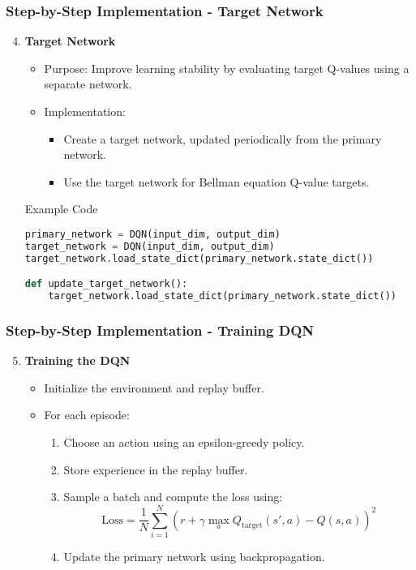 \documentclass[aspectratio=169]{beamer}
\begin{document}
\begin{frame}[fragile]
    \frametitle{Step-by-Step Implementation - Target Network}
    \begin{enumerate}
        \setcounter{enumi}{3}
        \item \textbf{Target Network}
        \begin{itemize}
            \item Purpose: Improve learning stability by evaluating target Q-values using a separate network.
            \item Implementation:
            \begin{itemize}
                \item Create a target network, updated periodically from the primary network.
                \item Use the target network for Bellman equation Q-value targets.
            \end{itemize}
        \end{itemize}
        \begin{block}{Example Code}
        \begin{lstlisting}[language=Python]
primary_network = DQN(input_dim, output_dim)
target_network = DQN(input_dim, output_dim)
target_network.load_state_dict(primary_network.state_dict())

def update_target_network():
    target_network.load_state_dict(primary_network.state_dict())
        \end{lstlisting}
        \end{block}
    \end{enumerate}
\end{frame}

\begin{frame}[fragile]
    \frametitle{Step-by-Step Implementation - Training DQN}
    \begin{enumerate}
        \setcounter{enumi}{4}
        \item \textbf{Training the DQN}
        \begin{itemize}
            \item Initialize the environment and replay buffer.
            \item For each episode:
            \begin{enumerate}
                \item Choose an action using an epsilon-greedy policy.
                \item Store experience in the replay buffer.
                \item Sample a batch and compute the loss using:
                \begin{equation}
                \text{Loss} = \frac{1}{N} \sum_{i=1}^{N} \left( r + \gamma \max_a Q_{\text{target}}(s', a) - Q(s, a) \right)^2
                \end{equation}
                \item Update the primary network using backpropagation.
            \end{enumerate}
        \end{itemize}
    \end{enumerate}
\end{frame}
\end{document}

